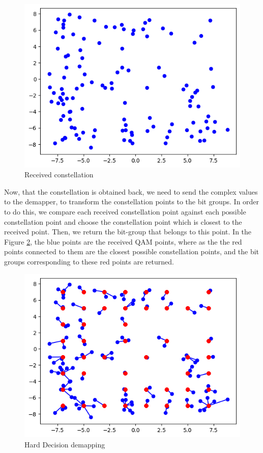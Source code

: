 \begin{figure}[htbp]
    \centering
    \includegraphics[width=\linewidth]{../Source/results/data_carriers}
    \caption{Received constellation}
    \label{received}
\end{figure}

Now, that the constellation is obtained back, we need to send the complex values to the demapper, to transform the constellation points to the bit groups. In order to do this, we compare each received constellation point against each possible constellation point and choose the constellation point which is closest to the received point. Then, we return the bit-group that belongs to this point. In the Figure \ref{hard-decision}, the blue points are the received QAM points, where as the the red points connected to them are the closest possible constellation points, and the bit groups corresponding to these red points are returned.

\begin{figure}[htbp]
    \centering
    \includegraphics[width=\linewidth]{../Source/results/demapping}
    \caption{Hard Decision demapping}
    \label{hard-decision}
\end{figure}

